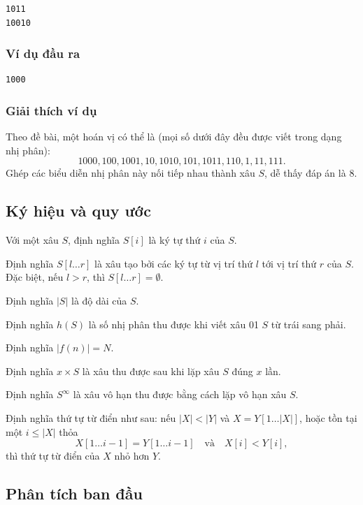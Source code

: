 \documentclass[11pt]{article}
\begin{document}
\begin{verbatim}
1011
10010
\end{verbatim}

\subsubsection{Ví dụ đầu ra}

\begin{verbatim}
1000
\end{verbatim}

\subsubsection{Giải thích ví dụ}

Theo đề bài, một hoán vị có thể là (mọi số dưới đây đều được viết trong dạng
nhị phân):
\[
1000,100,1001,10,1010,101,1011,110,1,11,111.
\]
Ghép các biểu diễn nhị phân này nối tiếp nhau thành xâu \(S\), dễ thấy đáp án
là \(8\).

\subsection{Ký hiệu và quy ước}

Với một xâu \(S\), định nghĩa \(S[i]\) là ký tự thứ \(i\) của \(S\).

Định nghĩa \(S[l\ldots r]\) là xâu tạo bởi các ký tự từ vị trí thứ \(l\) tới
vị trí thứ \(r\) của \(S\). Đặc biệt, nếu \(l>r\), thì
\(S[l\ldots r]=\emptyset\).

Định nghĩa \(|S|\) là độ dài của \(S\).

Định nghĩa \(h(S)\) là số nhị phân thu được khi viết xâu 01 \(S\) từ trái sang
phải.

Định nghĩa \(|f(n)|=N\).

Định nghĩa \(x\times S\) là xâu thu được sau khi lặp xâu \(S\) đúng \(x\) lần.

Định nghĩa \(S^\infty\) là xâu vô hạn thu được bằng cách lặp vô hạn xâu \(S\).

Định nghĩa thứ tự từ điển như sau: nếu \(|X|<|Y|\) và
\(X=Y[1\ldots |X|]\), hoặc tồn tại một \(i\le |X|\) thỏa
\[
X[1\ldots i-1]=Y[1\ldots i-1]\quad\text{và}\quad X[i]<Y[i],
\]
thì thứ tự từ điển của \(X\) nhỏ hơn \(Y\).

\subsection{Phân tích ban đầu}
\end{document}
